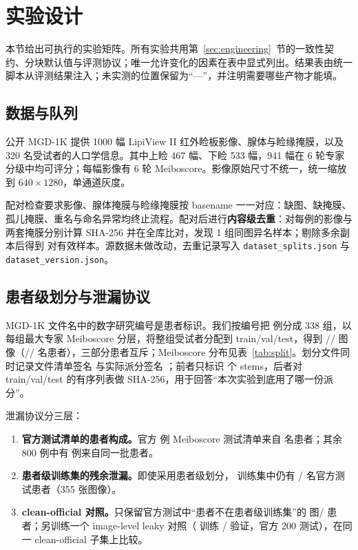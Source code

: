 \section{实验设计}\label{sec:experiments}

本节给出可执行的实验矩阵。所有实验共用第~\ref{sec:engineering}~节的一致性契约、分块默认值与评测协议；唯一允许变化的因素在表中显式列出。结果表由统一脚本从评测结果注入；未实测的位置保留为“—”，并注明需要哪些产物才能填。

\subsection{数据与队列}

公开 MGD-1K 提供 1000 幅 LipiView II 红外睑板影像、腺体与睑缘掩膜，以及 320 名受试者的人口学信息\cite{saha2022automated}。其中上睑 467 幅、下睑 533 幅，941 幅在 6 轮专家分级中均可评分；每幅影像有 6 轮 Meiboscore。影像原始尺寸不统一，统一缩放到 $640\times1280$，单通道灰度。

配对检查要求影像、腺体掩膜与睑缘掩膜按 basename 一一对应：缺图、缺掩膜、孤儿掩膜、重名与命名异常均终止流程。配对后进行\textbf{内容级去重}：对每例的影像与两套掩膜分别计算 SHA-256 并在全库比对，发现 1 组同图异名样本；剔除多余副本后得到 \nTotal{} 对有效样本。源数据未做改动，去重记录写入 \texttt{dataset\_splits.json} 与 \texttt{dataset\_version.json}。

\subsection{患者级划分与泄漏协议}\label{sec:split-design}

MGD-1K 文件名中的数字研究编号是患者标识。我们按编号把 \nTotal{} 例分成 338 组，以每组最大专家 Meiboscore 分层，将整组受试者分配到 train/val/test，得到 \nTrain/\nVal/\nTest{} 图像（\nTrainPatients/\nValPatients/\nTestPatients{} 名患者），三部分患者互斥；Meiboscore 分布见表~\ref{tab:split}。划分文件同时记录文件清单签名 \splitSig{} 与实际派分签名 \assignmentSig{}；前者只标识 \nTotal{} 个 stems，后者对 train/val/test 的有序列表做 SHA-256，用于回答“本次实验到底用了哪一份派分”。

泄漏协议分三层：
\begin{enumerate}[label=\textbf{L\arabic*.}]
\item \textbf{官方测试清单的患者构成。}官方 \officialTestImages{} 例 Meiboscore 测试清单来自 \officialTestPatients{} 名患者；其余 800 例中有 \officialLeakImages{} 例来自同一批患者。
\item \textbf{患者级训练集的残余泄漏。}即使采用患者级划分，\nTrain{} 训练集中仍有 \officialLeakPatients/\officialTestPatients{} 名官方测试患者（355 张图像）。
\item \textbf{clean-official 对照。}只保留官方测试中“患者不在患者级训练集”的 \cleanOfficialImages{} 图/\cleanOfficialPatients{} 患者；另训练一个 image-level leaky 对照（\leakyTrainImages{} 训练 / \leakyValImages{} 验证，官方 200 测试），在同一 clean-official 子集上比较。
\end{enumerate}

